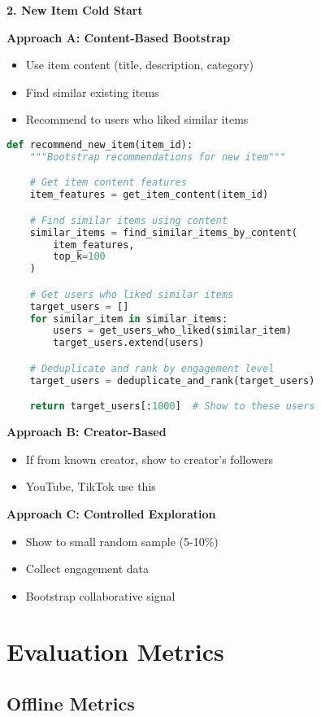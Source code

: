 \documentclass[10pt]{article}
\begin{document}
\textbf{2. New Item Cold Start}

\textbf{Approach A: Content-Based Bootstrap}
\begin{itemize}
\item Use item content (title, description, category)
\item Find similar existing items
\item Recommend to users who liked similar items
\end{itemize}

\begin{lstlisting}[language=Python]
def recommend_new_item(item_id):
    """Bootstrap recommendations for new item"""

    # Get item content features
    item_features = get_item_content(item_id)

    # Find similar items using content
    similar_items = find_similar_items_by_content(
        item_features,
        top_k=100
    )

    # Get users who liked similar items
    target_users = []
    for similar_item in similar_items:
        users = get_users_who_liked(similar_item)
        target_users.extend(users)

    # Deduplicate and rank by engagement level
    target_users = deduplicate_and_rank(target_users)

    return target_users[:1000]  # Show to these users
\end{lstlisting}

\textbf{Approach B: Creator-Based}
\begin{itemize}
\item If from known creator, show to creator's followers
\item YouTube, TikTok use this
\end{itemize}

\textbf{Approach C: Controlled Exploration}
\begin{itemize}
\item Show to small random sample (5-10\%)
\item Collect engagement data
\item Bootstrap collaborative signal
\end{itemize}

\section{Evaluation Metrics}

\subsection{Offline Metrics}
\end{document}
